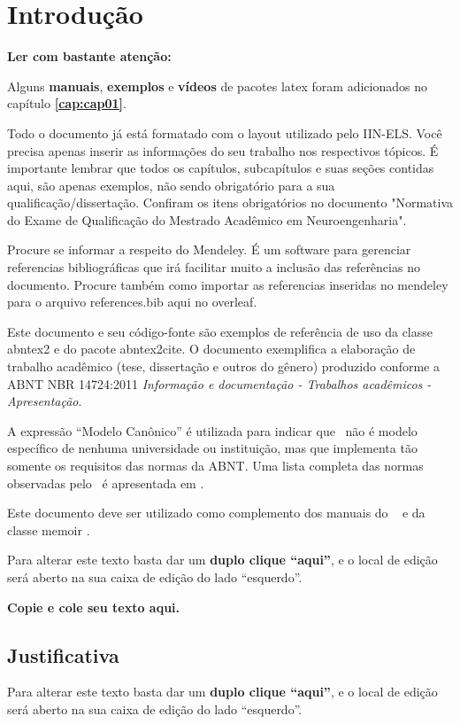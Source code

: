 \chapter[Introdução]{Introdução}

\textbf{Ler com bastante atenção:}

Alguns \textbf{manuais}, \textbf{exemplos} e \textbf{vídeos} de pacotes latex foram adicionados no capítulo \textbf{\ref{cap:cap01}}.

Todo o documento já está formatado com o layout utilizado pelo IIN-ELS. Você precisa apenas inserir as informações do seu trabalho nos respectivos tópicos.
É importante lembrar que todos os capítulos, subcapítulos e suas seções contidas aqui, são apenas exemplos, não sendo obrigatório para a sua qualificação/dissertação. Confiram os itens obrigatórios no documento "Normativa do Exame de Qualificação do Mestrado Acadêmico em Neuroengenharia".

Procure se informar a respeito do Mendeley. É um software para gerenciar referencias bibliográficas que irá facilitar muito a inclusão das referências no documento. Procure também como importar as referencias inseridas no mendeley para o arquivo references.bib aqui no overleaf.

Este documento e seu código-fonte são exemplos de referência de uso da classe \textsf{abntex2} e do pacote \textsf{abntex2cite}. O documento exemplifica a elaboração de trabalho acadêmico (tese, dissertação e outros do gênero) produzido conforme a ABNT NBR 14724:2011 \emph{Informação e documentação - Trabalhos acadêmicos - Apresentação}.

A expressão ``Modelo Canônico'' é utilizada para indicar que \abnTeX\ não é modelo específico de nenhuma universidade ou instituição, mas que implementa tão somente os requisitos das normas da ABNT. Uma lista completa das normas observadas pelo \abnTeX\ é apresentada em . 

Este documento deve ser utilizado como complemento dos manuais do \abnTeX\ \cite{abntex2classe,abntex2cite,abntex2cite-alf} e da classe \textsf{memoir} \cite{memoir}.

Para alterar este texto basta dar um 
\textbf{duplo clique “aqui”}, e o local de edição será aberto na sua caixa de edição do lado “esquerdo”.

\textbf{Copie e cole seu texto aqui.}


\section{Justificativa}
Para alterar este texto basta dar um 
\textbf{duplo clique “aqui”}, e o local de edição será aberto na sua caixa de edição do lado “esquerdo”.

